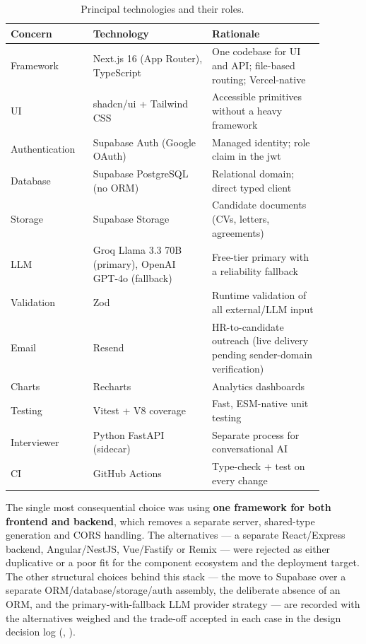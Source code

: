 \begin{table}[ht]
\centering
\caption[Technology stack]{Principal technologies and their roles.}
\label{tab:tech-stack}
\small
\begin{tabular}{p{0.22\linewidth}p{0.34\linewidth}p{0.32\linewidth}}
\toprule
\textbf{Concern} & \textbf{Technology} & \textbf{Rationale} \\
\midrule
Framework & Next.js 16 (App Router), TypeScript & One codebase for UI and API; file-based routing; Vercel-native \\
UI & shadcn/ui + Tailwind CSS & Accessible primitives without a heavy framework \\
Authentication & Supabase Auth (Google OAuth) & Managed identity; role claim in the \gls{jwt} \\
Database & Supabase PostgreSQL (no ORM) & Relational domain; direct typed client \\
Storage & Supabase Storage & Candidate documents (CVs, letters, agreements) \\
LLM & Groq Llama 3.3 70B (primary), OpenAI GPT-4o (fallback) & Free-tier primary with a reliability fallback \\
Validation & Zod & Runtime validation of all external/LLM input \\
Email & Resend & HR-to-candidate outreach (live delivery pending sender-domain verification) \\
Charts & Recharts & Analytics dashboards \\
Testing & Vitest + V8 coverage & Fast, ESM-native unit testing \\
Interviewer & Python FastAPI (sidecar) & Separate process for conversational AI \\
CI & GitHub Actions & Type-check + test on every change \\
\bottomrule
\end{tabular}
\end{table}

The single most consequential choice was using \textbf{one framework for
both frontend and backend}, which removes a separate server, shared-type
generation and CORS handling. The alternatives --- a separate React/Express
backend, Angular/NestJS, Vue/Fastify or Remix --- were rejected as either
duplicative or a poor fit for the component ecosystem and the deployment
target. The other structural choices behind this stack --- the move to
Supabase over a separate ORM/database/storage/auth assembly, the deliberate
absence of an ORM, and the primary-with-fallback LLM provider strategy --- are
recorded with the alternatives weighed and the trade-off accepted in each case
in the design decision log (,
).

